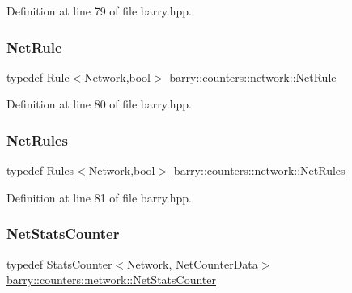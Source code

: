Definition at line 79 of file barry.\+hpp.

\mbox{\label{namespacebarry_1_1counters_1_1network_afbd2c2a61931e69dd5f668c421e87a6f}} 
\subsubsection{\texorpdfstring{Net\+Rule}{NetRule}}
{\footnotesize\ttfamily typedef \hyperlink{classbarry_1_1_rule}{Rule}$<$\hyperlink{namespacebarry_1_1counters_1_1network_a4cb88d4572ded3b447ea269c9cd0b2c0}{Network},bool$>$ \hyperlink{namespacebarry_1_1counters_1_1network_afbd2c2a61931e69dd5f668c421e87a6f}{barry\+::counters\+::network\+::\+Net\+Rule}}



Definition at line 80 of file barry.\+hpp.

\mbox{\label{namespacebarry_1_1counters_1_1network_adbdb20b3ce883777da2364984ea10c56}} 
\subsubsection{\texorpdfstring{Net\+Rules}{NetRules}}
{\footnotesize\ttfamily typedef \hyperlink{classbarry_1_1_rules}{Rules}$<$\hyperlink{namespacebarry_1_1counters_1_1network_a4cb88d4572ded3b447ea269c9cd0b2c0}{Network},bool$>$ \hyperlink{namespacebarry_1_1counters_1_1network_adbdb20b3ce883777da2364984ea10c56}{barry\+::counters\+::network\+::\+Net\+Rules}}



Definition at line 81 of file barry.\+hpp.

\mbox{\label{namespacebarry_1_1counters_1_1network_ae26c399917113fe280b3f2859376b8b9}} 
\subsubsection{\texorpdfstring{Net\+Stats\+Counter}{NetStatsCounter}}
{\footnotesize\ttfamily typedef \hyperlink{classbarry_1_1_stats_counter}{Stats\+Counter}$<$\hyperlink{namespacebarry_1_1counters_1_1network_a4cb88d4572ded3b447ea269c9cd0b2c0}{Network}, \hyperlink{classbarry_1_1counters_1_1network_1_1_net_counter_data}{Net\+Counter\+Data}$>$ \hyperlink{namespacebarry_1_1counters_1_1network_ae26c399917113fe280b3f2859376b8b9}{barry\+::counters\+::network\+::\+Net\+Stats\+Counter}}



